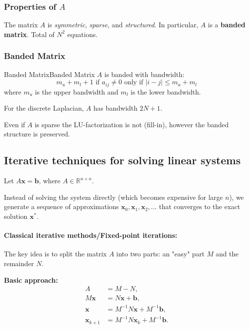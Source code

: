 \subsubsection{Properties of $A$}
The matrix $A$ is \emph{symmetric}, \emph{sparse}, and \emph{structured}. In particular, $A$ is a \textbf{banded matrix}.
Total of $N^2$ equations.
\subsubsection{Banded Matrix}
\begin{definition}{Banded Matrix}{Banded Matrix}
    $A$ is banded with bandwidth:
    \begin{equation}
        m_u + m_l + 1 \text{ if } a_{ij} \neq 0 \text{ only if } |i - j| \leq m_u + m_l
    \end{equation}
    where $m_u$ is the upper bandwidth and $m_l$ is the lower bandwidth.
\end{definition}

For the discrete Laplacian, $A$ has bandwidth $2N + 1$.

Even if $A$ is sparse the LU-factorization is not (fill-in), however the banded structure is preserved.

\subsection{Iterative techniques for solving linear systems}
Let $A\mathbf{x} = \mathbf{b}$, where $A \in \mathbb{R}^{n \times n}$.

Instead of solving the system directly (which becomes expensive for large $n$), we generate a sequence of approximations $\mathbf{x}_0, \mathbf{x}_1, \mathbf{x}_2, \ldots$ that converges to the exact solution $\mathbf{x}^*$.

\paragraph{Classical iterative methods/Fixed-point iterations:}
The key idea is to split the matrix $A$ into two parts: an "easy" part $M$ and the remainder $N$.

\textbf{Basic approach:}
\begin{align*}
    A                & = M - N,                                  \\
    M\mathbf{x}      & = N\mathbf{x} + \mathbf{b},               \\
    \mathbf{x}       & = M^{-1}N\mathbf{x} + M^{-1}\mathbf{b},   \\
    \mathbf{x}_{k+1} & = M^{-1}N\mathbf{x}_k + M^{-1}\mathbf{b}.
\end{align*}

